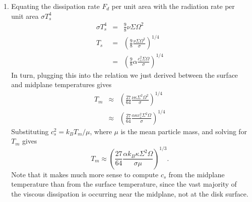 \begin{enumerate}
\begin{enumerate}
\item Equating the dissipation rate $F_d$ per unit area with the radiation rate per unit area $\sigma T_s^4$ 
\begin{eqnarray*}
\sigma T_s ^4 & = &\frac{9}{8} \nu \Sigma \Omega^2\\
T_s & = & \left(\frac{9}{8}\frac{\nu\Sigma\Omega^2}{\sigma}\right)^{1/4} \\
& = & \left(\frac{9}{8} \alpha \frac{c_s^2 \Sigma \Omega}{\sigma}\right)^{1/4}
\end{eqnarray*}
In turn, plugging this into the relation we just derived between the surface and midplane temperatures gives
\begin{eqnarray*}
T_m & \approx & \left(\frac{27}{64} \frac{\nu \kappa \Sigma^2 \Omega^2}{\sigma}\right)^{1/4} \\
& \approx & \left(\frac{27}{64} \frac{\alpha \kappa c_s^2 \Sigma^2 \Omega}{\sigma}\right)^{1/4}
\end{eqnarray*}
Substituting $c_s^2 = k_B T_m / \mu$, where $\mu$ is the mean particle mass, and solving for $T_m$ gives
\begin{displaymath}
T_m \approx
\left(\frac{27}{64} \frac{\alpha k_B \kappa \Sigma^2 \Omega}{\sigma \mu}\right)^{1/3}.
\end{displaymath}
Note that it makes much more sense to compute $c_s$ from the midplane temperature than from the surface temperature, since the vast majority of the viscous dissipation is occurring near the midplane, not at the disk surface.\\


\end{enumerate}
\end{enumerate}
